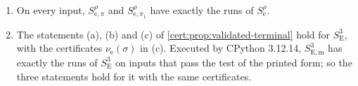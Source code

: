 \begin{proposition}\label{cert:prop:phase-guards}
\begin{enumerate}[label=(\alph*)]
\item On every input, $S^{\rho}_{\mathrm e,\pi}$ and $S^{\rho}_{\mathrm e,\pi_1}$ have
exactly the runs of $S^{\rho}_{\mathrm e}$.
\item The statements (a), (b) and (c) of \cref{cert:prop:validated-terminal} hold for
$S^{3}_{\mathrm E}$, with the certificates $\nu_{\mathrm e}(\sigma)$ in (c). Executed by
CPython 3.12.14, $S^{3}_{\mathrm{E,m}}$ has exactly the runs of $S^{3}_{\mathrm E}$ on
inputs that pass the test of the printed form; so the three statements hold for it with
the same certificates.
\end{enumerate}
\end{proposition}
